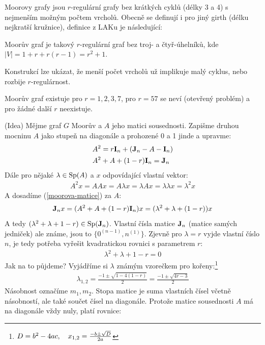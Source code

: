 Moorovy grafy jsou $r$-regulární grafy bez krátkých cyklů (délky 3 a 4) s nejmenším možným počtem vrcholů. Obecně se definují i pro jiný girth (délku nejkratší kružnice), definice z LAKu je následující:

\df Moorův graf je takový $r$-regulární graf bez troj- a čtyř-úhelníků, kde $|V| = 1 + r + r(r-1) = r^2 + 1$.

Konstrukcí lze ukázat, že menší počet vrcholů už implikuje malý cyklus, nebo rozbije $r$-regulárnost.

\vt Moorův graf existuje pro $r=1,2,3,7$, pro $r=57$ se neví (otevřený problém) a pro žádné další $r$ neexistuje.

\dk (Idea) Mějme graf $G$ Moorův a $A$ jeho matici sousednosti. Zapišme druhou 
mocninu $A$ jako stupeň na diagonále a prohozené 0 a 1 jinde a upravme:
\begin{align}
	&A^2 = r{\bf I}_n + ({\bf J}_n- A - {\bf I}_n) \\
	\label{moorova-matice}&A^2 + A + (1-r){\bf I}_n = {\bf J}_n
\end{align}
Dále pro nějaké $\lambda\in \operatorname{Sp}(A)$ a $x$ odpovídající vlastní vektor:
\begin{align}
	\label{moorova-mocnina}A^2 x = AAx = A\lambda x = \lambda A x = \lambda 
	\lambda x = \lambda^2 x
\end{align}
A dosadíme (\ref{moorova-matice}) za $A$:
\begin{align}
	{\bf J}_nx = (A^2 + A + (1-r){\bf I}_n)x = (\lambda^2 + \lambda + (1-r))x
\end{align}
A tedy $(\lambda^2 + \lambda + 1 -r) \in \operatorname{Sp}({\bf J}_n)$. Vlastní čísla matice ${\bf J}_n$ 
(matice samých jedniček) ale známe, jsou to $\{0^{(n-1)}, n^{(1)}\}$. Zjevně pro 
$\lambda = r$ vyjde vlastní číslo $n$, je tedy potřeba vyřešit kvadratickou 
rovnici s parametrem $r$:
\begin{align}
	\lambda^2 + \lambda + 1 - r = 0
\end{align}
Jak na to půjdeme? Vyjádříme si $\lambda$ známým vzorečkem pro kořeny:\footnote{$D=b^2-4ac,\quad x_{1,2} = {-b \pm \sqrt D \over 2a}$}
\begin{align}
	\lambda_{1,2} = \frac{-1\pm \sqrt{1-4(1-r)}}{2} = \frac{-1\pm\sqrt{4r-3}}{2}
\end{align}
Násobnost označíme $m_1, m_2$. Stopa matice je suma vlastních čísel včetně
násobností, ale také součet čísel na diagonále. Protože matice sousednosti $A$
má na diagonále vždy nuly, platí rovnice:


